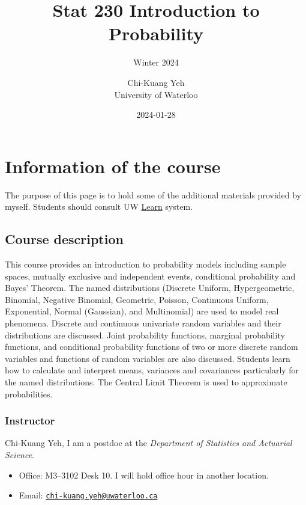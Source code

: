 \documentclass[
]{book}
\title{Stat 230 Introduction to Probability}
\subtitle{Winter 2024}
\author{Chi-Kuang Yeh\\
University of Waterloo}
\date{2024-01-28}
\providecommand{\tightlist}{%
  \setlength{\itemsep}{0pt}\setlength{\parskip}{0pt}}
\theoremstyle{definition}
\theoremstyle{definition}
\theoremstyle{definition}
\theoremstyle{definition}
\theoremstyle{remark}
\begin{document}
\maketitle

{
\setcounter{tocdepth}{1}
\tableofcontents
}
\hypertarget{information-of-the-course}{%
\chapter{Information of the course}\label{information-of-the-course}}

The purpose of this page is to hold some of the additional materials provided by myself. Students should consult UW \href{https://api-4ccc589b.duosecurity.com/frame/v4/preauth/healthcheck?sid=frameless-c0657e9d-cb86-4ac9-a6a7-fd054ae21fd5}{Learn} system.

\hypertarget{course-description}{%
\section{Course description}\label{course-description}}

This course provides an introduction to probability models including sample spaces, mutually exclusive and independent events, conditional probability and Bayes' Theorem. The named distributions (Discrete Uniform, Hypergeometric, Binomial, Negative Binomial, Geometric, Poisson, Continuous Uniform, Exponential, Normal (Gaussian), and Multinomial) are used to model real phenomena. Discrete and continuous univariate random variables and their distributions are discussed. Joint probability functions, marginal probability functions, and conditional probability functions of two or more discrete random variables and functions of random variables are also discussed. Students learn how to calculate and interpret means, variances and covariances particularly for the named distributions. The Central Limit Theorem is used to approximate probabilities.

\hypertarget{instructor}{%
\subsection{Instructor}\label{instructor}}

Chi-Kuang Yeh, I am a postdoc at the \emph{Department of Statistics and Actuarial Science}.

\begin{itemize}
\tightlist
\item
  Office: M3--3102 Desk 10. I will hold office hour in another location.
\item
  Email: \href{mailto:chi-kuang.yeh@uwaterloo.ca}{\nolinkurl{chi-kuang.yeh@uwaterloo.ca}}
\end{itemize}
\end{document}
